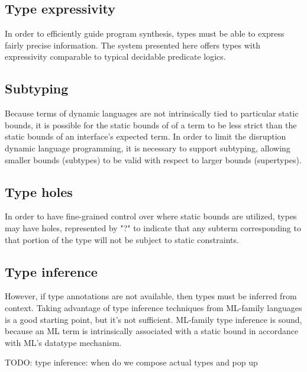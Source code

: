 \documentclass[]{acmart}
\begin{document}
\subsection*{Type expressivity}
In order to efficiently guide program synthesis, types must be able to express 
fairly precise information. 
The system presented here offers types with 
expressivity comparable to typical decidable predicate logics. 

\subsection*{Subtyping}
Because terms of dynamic languages are not intrinsically tied to particular static bounds,
it is possible for the static bounds of of a term to be less strict than the static bounds 
of an interface's expected term. In order to limit the disruption dynamic language programming,
it is necessary to support subtyping, allowing smaller bounds (subtypes) 
to be valid with respect to larger bounds (supertypes). 


\subsection*{Type holes}
In order to have fine-grained control over where static bounds are utilized, 
types may have holes, represented by "?" to indicate that any subterm corresponding to that
portion of the type will not be subject to static constraints.

\subsection*{Type inference}
However, if type annotations are not available, then types must be inferred from context. 
Taking advantage of type inference techniques from ML-family languages is a good starting point,
but it's not sufficient. ML-family type inference is sound, because an ML term is 
intrinsically associated with a static bound in accordance with ML's datatype mechanism.

TODO: type inference: when do we compose actual types and pop up
\end{document}
